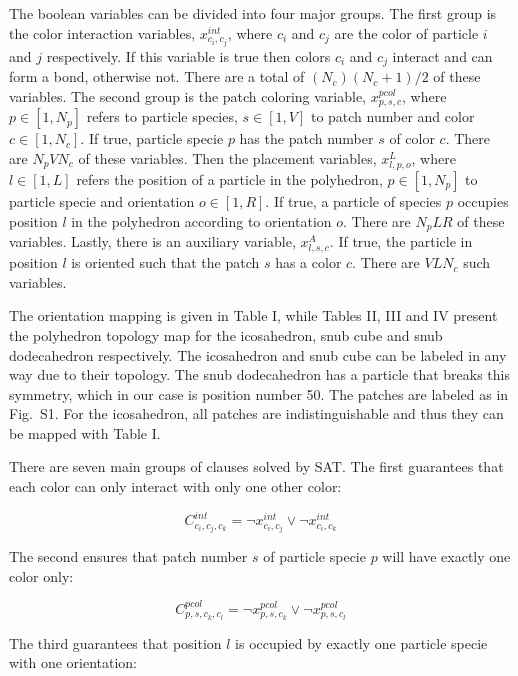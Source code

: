 \documentclass[a4paper, amsfonts, amssymb, amsmath, reprint, showkeys, nofootinbib, twoside]{revtex4-1}
\begin{document}
The boolean variables can be divided into four major groups. The first group is the color interaction variables, $x_{c_i,c_j}^{int}$, where $c_i$ and $c_j$ are the color of particle $i$ and $j$ respectively. If this variable is true then colors $c_i$ and $c_j$ interact and can form a bond, otherwise not. There are a total of $(N_c)(N_c+1)/2$ of these variables. The second group is the patch coloring variable, $x_{p,s,c}^{pcol}$, where $p\in [1, N_p]$ refers to particle species, $s\in [1, V]$ to patch number and color $c\in [1, N_c]$. If true, particle specie $p$ has the patch number $s$ of color $c$. There are $N_pVN_c$ of these variables. Then the placement variables, $x_{l,p,o}^{L}$, where $l\in [1, L]$ refers the position of a particle in the polyhedron, $p\in [1, N_p]$ to particle specie and orientation $o\in [1, R]$. If true, a particle of species $p$ occupies position $l$ in the polyhedron according to orientation $o$. There are $N_pLR$ of these variables. Lastly, there is an auxiliary variable, $x_{l,s,c}^{A}$. If true, the particle in position $l$ is oriented such that the patch $s$ has a color $c$. There are $VLN_c$ such variables.

The orientation mapping is given in Table I, while Tables II, III and IV present the polyhedron topology map for the icosahedron, snub cube and snub dodecahedron respectively. The icosahedron and snub cube can be labeled in any way due to their topology. The snub dodecahedron has a particle that breaks this symmetry, which in our case is position number 50. The patches are labeled as in Fig.~S1. For the icosahedron, all patches are indistinguishable and thus they can be mapped with Table I.

There are seven main groups of clauses solved by SAT. The first guarantees that each color can only interact with only one other color:

\begin{equation}
C^{int}_{c_i,c_j,c_k}=\neg x_{c_i,c_j}^{int} \vee \neg x_{c_i,c_k}^{int}
\end{equation}

The second ensures that patch number $s$ of particle specie $p$ will have exactly one color only:

\begin{equation}
C^{pcol}_{p,s,c_k,c_l}=\neg x_{p,s,c_k}^{pcol} \vee \neg x_{p,s,c_l}^{pcol}
\end{equation}

The third guarantees that position $l$ is occupied by exactly one particle specie with one orientation:
\end{document}
